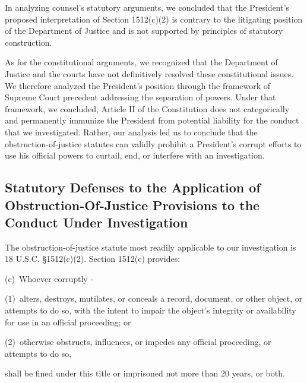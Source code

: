In analyzing counsel’s statutory arguments, we concluded that the President’s proposed interpretation of Section 1512(c)(2) is contrary to the litigating position of the Department of Justice and is not supported by principles of statutory construction.

As for the constitutional arguments, we recognized that the Department of Justice and the courts have not definitively resolved these constitutional issues.
We therefore analyzed the President’s position through the framework of Supreme Court precedent addressing the separation of powers.
Under that framework, we concluded, Article II of the Constitution does not categorically and permanently immunize the President from potential liability for the conduct that we investigated.
Rather, our analysis led us to conclude that the obstruction-of-justice statutes can validly prohibit a President’s corrupt efforts to use his official powers to curtail, end, or interfere with an investigation.

\subsection{Statutory Defenses to the Application of Obstruction-Of-Justice Provisions to the Conduct Under Investigation}

The obstruction-of-justice statute most readily applicable to our investigation is 18 U.S.C. \S 1512(c)(2). Section 1512(c) provides:

(c)~Whoever corruptly -

(1)~alters, destroys, mutilates, or conceals a record, document, or other object, or attempts to do so, with the intent to impair the object’s integrity or availability for use in an official proceeding; or

(2)~otherwise obstructs, influences, or impedes any official proceeding, or attempts to do so,

shall be fined under this title or imprisoned not more than 20 years, or both.

